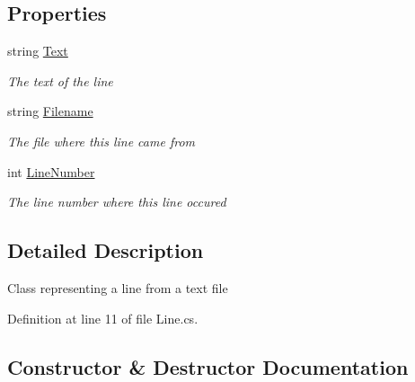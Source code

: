 \subsection*{Properties}
\begin{DoxyCompactItemize}
\item 
string \hyperlink{classHumDrum_1_1Operations_1_1Files_1_1Line_a885daada20e09b8b049b1804b0b44005}{Text}
\begin{DoxyCompactList}\small\item\em The text of the line \end{DoxyCompactList}\item 
string \hyperlink{classHumDrum_1_1Operations_1_1Files_1_1Line_ac9436ae7b88a971f32d4011a7e523d26}{Filename}
\begin{DoxyCompactList}\small\item\em The file where this line came from \end{DoxyCompactList}\item 
int \hyperlink{classHumDrum_1_1Operations_1_1Files_1_1Line_acb6f59b3bf5a85ebfb190f53d0cb7c3b}{Line\+Number}
\begin{DoxyCompactList}\small\item\em The line number where this line occured \end{DoxyCompactList}\end{DoxyCompactItemize}


\subsection{Detailed Description}
Class representing a line from a text file 



Definition at line 11 of file Line.\+cs.



\subsection{Constructor \& Destructor Documentation}
\hypertarget{classHumDrum_1_1Operations_1_1Files_1_1Line_a0156389122d6b73dc7d12dfa3025c89c}{}
